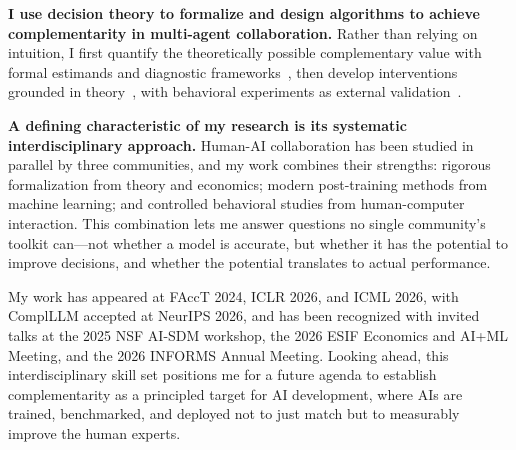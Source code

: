 \textbf{I use decision theory to formalize and design algorithms to achieve complementarity in multi-agent collaboration. } 
Rather than relying on intuition, I first quantify the theoretically possible complementary value with formal estimands and diagnostic frameworks~\cite{guo2024decision, guo2026value, guo2026explanations}, then develop interventions grounded in theory~\cite{guo2026complllm}, with behavioral experiments as external validation~\cite{guo2026value}.

\textbf{A defining characteristic of my research is its systematic interdisciplinary approach.}
Human-AI collaboration has been studied in parallel by three communities, and my work combines their strengths: rigorous formalization from theory and economics; modern post-training methods from machine learning; and controlled behavioral studies from human-computer interaction.
This combination lets me answer questions no single community's toolkit can---not whether a model is accurate, but whether it has the potential to improve decisions, and whether the potential translates to actual performance.


My work has appeared at FAccT 2024, ICLR 2026, and ICML 2026, with ComplLLM accepted at NeurIPS 2026, and has been recognized with invited talks at the 2025 NSF AI-SDM workshop, the 2026 ESIF Economics and AI+ML Meeting, and the 2026 INFORMS Annual Meeting.
Looking ahead, this interdisciplinary skill set positions me for a future agenda to establish complementarity as a principled target for AI development, where AIs are trained, benchmarked, and deployed not to just match but to measurably improve the human experts.
